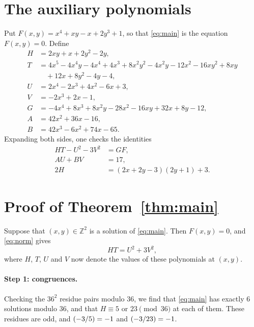 \documentclass[11pt]{article}
\newcommand{\Z}{\mathbb{Z}}
\newcommand{\leg}[2]{\mathchoice{\biggl(\dfrac{#1}{#2}\biggr)}{(#1/#2)}{(#1/#2)}{(#1/#2)}}
\begin{document}
\section{The auxiliary polynomials}

Put $F(x,y)=x^{4}+xy-x+2y^{3}+1$, so that \eqref{eq:main} is the equation $F(x,y)=0$. Define
\begin{align*}
H&=2xy+x+2y^{2}-2y,\\
T&=4x^{5}-4x^{4}y-4x^{4}+4x^{3}+8x^{2}y^{2}-4x^{2}y-12x^{2}-16xy^{2}+8xy\\
&\quad+12x+8y^{2}-4y-4,\\
U&=2x^{4}-2x^{3}+4x^{2}-6x+3,\\
V&=-2x^{3}+2x-1,\\
G&=-4x^{4}+8x^{3}+8x^{2}y-28x^{2}-16xy+32x+8y-12,\\
A&=42x^{2}+36x-16,\\
B&=42x^{3}-6x^{2}+74x-65.
\end{align*}
Expanding both sides, one checks the identities
\begin{align}
HT-U^2-3V^2&=GF,\label{eq:norm}\\
AU+BV&=17,\label{eq:bezout}\\
2H&=(2x+2y-3)(2y+1)+3.\label{eq:sign}
\end{align}

\section{Proof of Theorem~\ref{thm:main}}

Suppose that $(x,y)\in\Z^2$ is a solution of \eqref{eq:main}. Then $F(x,y)=0$, and \eqref{eq:norm} gives
\begin{equation}\label{eq:HT}
HT=U^2+3V^2,
\end{equation}
where $H$, $T$, $U$ and $V$ now denote the values of these polynomials at $(x,y)$.

\paragraph{Step 1: congruences.} Checking the $36^2$ residue pairs modulo $36$, we find that \eqref{eq:main} has exactly 6 solutions modulo $36$, and that $H\equiv5\text{ or }23\pmod{36}$ at each of them. These residues are odd, and $\leg{-3}{5}=-1$ and $\leg{-3}{23}=-1$.
\end{document}
